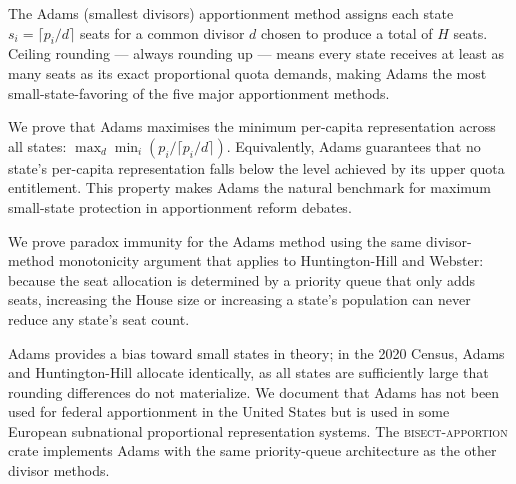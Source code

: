 The Adams (smallest divisors) apportionment method assigns each state
$s_i = \lceil p_i/d \rceil$ seats for a common divisor $d$ chosen to
produce a total of $H$ seats.
Ceiling rounding --- always rounding up --- means every state receives
at least as many seats as its exact proportional quota demands,
making Adams the most small-state-favoring of the five major apportionment
methods.

We prove that Adams maximises the minimum per-capita representation across
all states: $\max_d \min_i (p_i / \lceil p_i/d \rceil)$.
Equivalently, Adams guarantees that no state's per-capita representation
falls below the level achieved by its upper quota entitlement.
This property makes Adams the natural benchmark for maximum small-state
protection in apportionment reform debates.

We prove paradox immunity for the Adams method using the same
divisor-method monotonicity argument that applies to Huntington-Hill
and Webster: because the seat allocation is determined by a priority
queue that only adds seats, increasing the House size or increasing a
state's population can never reduce any state's seat count.

Adams provides a bias toward small states in theory; in the 2020 Census,
Adams and Huntington-Hill allocate identically, as all states are sufficiently
large that rounding differences do not materialize.
We document that Adams has not been used for federal apportionment
in the United States but is used in some European subnational
proportional representation systems.
The \textsc{bisect-apportion} crate implements Adams with the same
priority-queue architecture as the other divisor methods.
